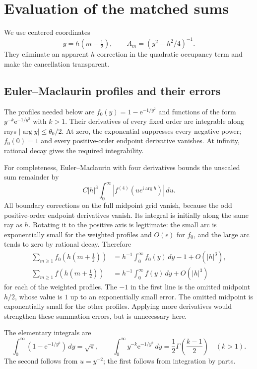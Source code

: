 \documentclass[11pt,letterpaper]{article}
\numberwithin{equation}{section}
\theoremstyle{definition}\newtheorem{definition}[theorem]{Definition}
\theoremstyle{remark}\newtheorem{remark}[theorem]{Remark}
\newcommand{\ii}{\mathrm i}
\newcommand{\ee}{\mathrm e}
\begin{document}
\section{Evaluation of the matched sums}\label{dmv:cnt:sec:evaluation}
We use centered coordinates
\begin{equation}\label{dmv:cnt:eq:center}
y=h(m+\tfrac12),\qquad
A_m=(y^2-h^2/4)^{-1}.
\end{equation}
They eliminate an apparent $h$ correction in the quadratic occupancy term and make the cancellation transparent.

\subsection{Euler--Maclaurin profiles and their errors}
The profiles needed below are $f_0(y)=1-\ee^{-1/y^2}$ and functions of the form $y^{-k}\ee^{-1/y^2}$ with $k>1$. Their derivatives of every fixed order are integrable along rays $|\arg y|\le\theta_0/2$. At zero, the exponential suppresses every negative power; $f_0(0)=1$ and every positive-order endpoint derivative vanishes. At infinity, rational decay gives the required integrability.

For completeness, Euler--Maclaurin with four derivatives bounds the unscaled sum remainder by
\[
C|h|^3\int_0^\infty |f^{(4)}(ue^{\ii\arg h})|\,du.
\]
All boundary corrections on the full midpoint grid vanish, because the odd positive-order endpoint derivatives vanish. Its integral is initially along the same ray as $h$. Rotating it to the positive axis is legitimate: the small arc is exponentially small for the weighted profiles and $O(\epsilon)$ for $f_0$, and the large arc tends to zero by rational decay. Therefore
\begin{align}\label{dmv:cnt:eq:EM}
\sum_{m\ge1}f_0(h(m+\tfrac12))
 &=h^{-1}\int_0^\infty f_0(y)\,dy-1+O(|h|^3),\\
\sum_{m\ge1}f(h(m+\tfrac12))
 &=h^{-1}\int_0^\infty f(y)\,dy+O(|h|^3)\nonumber
\end{align}
for each of the weighted profiles. The $-1$ in the first line is the omitted midpoint $h/2$, whose value is $1$ up to an exponentially small error. The omitted midpoint is exponentially small for the other profiles. Applying more derivatives would strengthen these summation errors, but is unnecessary here.

The elementary integrals are
\begin{equation}\label{dmv:cnt:eq:profileintegrals}
\int_0^\infty(1-\ee^{-1/y^2})\,dy=\sqrt\pi,\qquad
\int_0^\infty y^{-k}\ee^{-1/y^2}\,dy
=\frac12\Gamma\left(\frac{k-1}{2}\right)\quad(k>1).
\end{equation}
The second follows from $u=y^{-2}$; the first follows from integration by parts.
\end{document}
